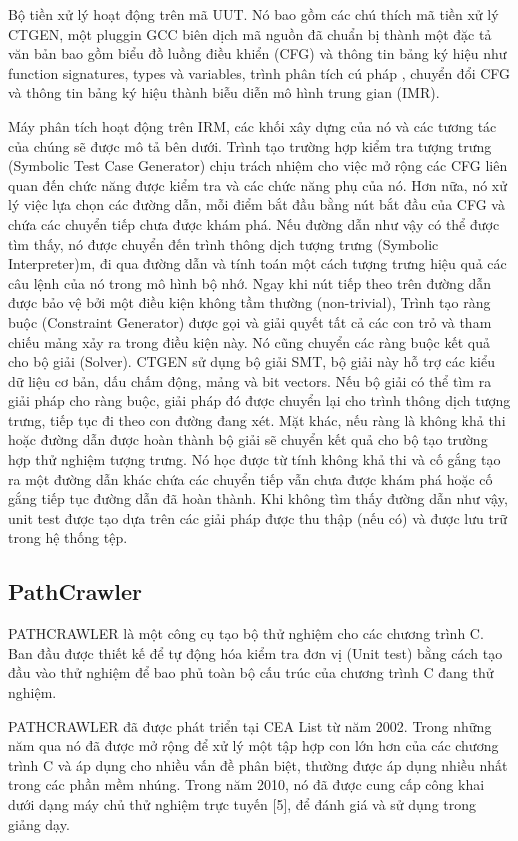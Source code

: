 \documentclass[12pt,a4paper]{article}
\begin{document}
\indent Bộ tiền xử lý hoạt động trên mã UUT. Nó bao gồm các chú thích mã tiền xử lý CTGEN, một pluggin GCC biên dịch mã nguồn đã chuẩn bị thành một đặc tả văn bản bao gồm biểu đồ luồng điều khiển (CFG) và thông tin bảng ký hiệu như function signatures, types và variables, trình phân tích cú pháp , chuyển đổi CFG và thông tin bảng ký hiệu thành biễu diễn mô hình trung gian (IMR).

\indent Máy phân tích hoạt động trên IRM, các khối xây dựng của nó và các tương tác của chúng sẽ được mô tả bên dưới. Trình tạo trường hợp kiểm tra tượng trưng (Symbolic Test Case Generator) chịu trách nhiệm cho việc mở rộng các CFG liên quan đến chức năng được kiểm tra và các chức năng phụ của nó. Hơn nữa, nó xử lý việc lựa chọn các đường dẫn, mỗi điểm bắt đầu bằng nút bắt đầu của CFG và chứa các chuyển tiếp chưa được khám phá. Nếu đường dẫn như vậy có thể được tìm thấy, nó được chuyển đến trình thông dịch tượng trưng (Symbolic Interpreter)m, đi qua đường dẫn và tính toán một cách tượng trưng hiệu quả các câu lệnh của nó trong mô hình bộ nhớ. Ngay khi nút tiếp theo trên đường dẫn được bảo vệ bởi một điều kiện không tầm thường (non-trivial), Trình tạo ràng buộc (Constraint Generator) được gọi và giải quyết tất cả các con trỏ và tham chiếu mảng xảy ra trong điều kiện này. Nó cũng chuyển các ràng buộc kết quả cho bộ giải (Solver). CTGEN sử dụng bộ giải SMT, bộ giải này hỗ trợ các kiểu dữ liệu cơ bản, dấu chấm động, mảng và bit vectors. Nếu bộ giải có thể tìm ra giải pháp cho ràng buộc, giải pháp đó được chuyển lại cho trình thông dịch tượng trưng, tiếp tục đi theo con đường đang xét. Mặt khác, nếu ràng là không khả thi hoặc đường dẫn được hoàn thành bộ giải sẽ chuyển kết quả cho bộ tạo trường hợp thử nghiệm tượng trưng. Nó học được từ tính không khả thi và cố gắng tạo ra một đường dẫn khác chứa các chuyển tiếp vẫn chưa được khám phá hoặc cố gắng tiếp tục đường dẫn đã hoàn thành. Khi không tìm thấy đường dẫn như vậy, unit test được tạo dựa trên các giải pháp được thu thập (nếu có) và được lưu trữ trong hệ thống tệp. 
\subsection{PathCrawler}
PATHCRAWLER là một công cụ tạo bộ thử nghiệm cho các chương trình C. Ban đầu được thiết kế để tự động hóa  kiểm tra đơn vị (Unit test) bằng cách tạo đầu vào thử nghiệm để bao phủ toàn bộ cấu trúc của chương trình C đang thử nghiệm.

\indent PATHCRAWLER đã được phát triển tại CEA List từ năm 2002. Trong những năm qua nó đã được mở rộng để xử lý một tập hợp con lớn hơn của các chương trình C và áp dụng cho nhiều vấn đề phân biệt, thường được áp dụng nhiều nhất trong các phần mềm nhúng. Trong năm 2010, nó đã được cung cấp công khai dưới dạng máy chủ thử nghiệm trực tuyến [5], để đánh giá và sử dụng trong giảng dạy.
\end{document}
